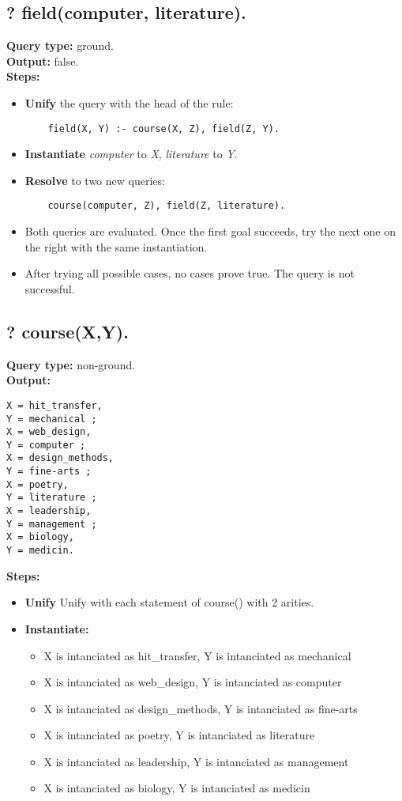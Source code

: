 \subsection{? field(computer, literature).}
\textbf{Query type: } ground. \\
\textbf{Output:} false. \\

\textbf{Steps:}
\begin{itemize}
    \item \textbf{Unify} the query with the head of the rule:
    \begin{lstlisting}
    field(X, Y) :- course(X, Z), field(Z, Y).
    \end{lstlisting}
\item \textbf{Instantiate} \textit{computer} to \textit{X}, \textit{literature} to \textit{Y}.
    \item \textbf{Resolve} to two new queries:
    \begin{lstlisting}
    course(computer, Z), field(Z, literature).
    \end{lstlisting}
\item Both queries are evaluated. Once the first goal succeeds, try the next one on the right with the same instantiation.
\item After trying all possible cases, no cases prove true. The query is not successful.
\end{itemize}


\subsection{? course(X,Y).}
\textbf{Query type: } non-ground. \\
\textbf{Output:}
\begin{lstlisting}
X = hit_transfer, 
Y = mechanical ; 
X = web_design, 
Y = computer ; 
X = design_methods, 
Y = fine-arts ; 
X = poetry, 
Y = literature ; 
X = leadership, 
Y = management ; 
X = biology, 
Y = medicin. 
\end{lstlisting}

\textbf{Steps:}
\begin{itemize}
    \item \textbf{Unify} Unify with each statement of course() with 2 arities.
    \item \textbf{Instantiate: } 
    \begin{itemize}
        \item X is intanciated as hit\_transfer, Y is intanciated as mechanical
        \item X is intanciated as web\_design, Y is intanciated as computer
        \item X is intanciated as design\_methods, Y is intanciated as fine-arts
        \item X is intanciated as poetry, Y is intanciated as literature
        \item X is intanciated as leadership, Y is intanciated as management
        \item X is intanciated as biology, Y is intanciated as medicin
    \end{itemize}
\end{itemize}


